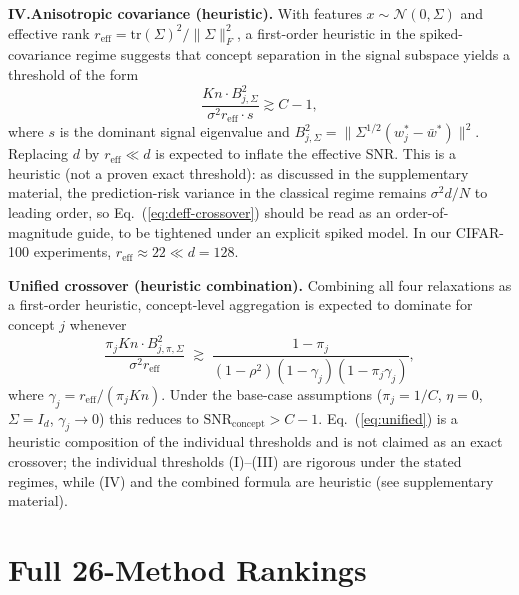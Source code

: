 \documentclass[11pt]{article}
\newcommand{\SNR}{\mathrm{SNR}_{\mathrm{concept}}}
\begin{document}
\textbf{IV.\;Anisotropic covariance (heuristic).}
With features $x \sim \mathcal{N}(0, \Sigma)$ and effective rank $r_{\mathrm{eff}} = \mathrm{tr}(\Sigma)^2 / \|\Sigma\|_F^2$, a first-order heuristic in the spiked-covariance regime suggests that concept separation in the signal subspace yields a threshold of the form
\begin{equation}\label{eq:deff-crossover}
\frac{Kn \cdot B_{j,\Sigma}^2}{\sigma^2 r_{\mathrm{eff}} \cdot s} \gtrsim C - 1,
\end{equation}
where $s$ is the dominant signal eigenvalue and $B_{j,\Sigma}^2 = \|\Sigma^{1/2}(w_j^* - \bar w^*)\|^2$.
Replacing $d$ by $r_{\mathrm{eff}} \ll d$ is expected to inflate the effective SNR. This is a heuristic (not a proven exact threshold): as discussed in the supplementary material, the prediction-risk variance in the classical regime remains $\sigma^2 d / N$ to leading order, so Eq.~(\ref{eq:deff-crossover}) should be read as an order-of-magnitude guide, to be tightened under an explicit spiked model.
In our CIFAR-100 experiments, $r_{\mathrm{eff}} \approx 22 \ll d = 128$.

\textbf{Unified crossover (heuristic combination).}
Combining all four relaxations as a first-order heuristic, concept-level aggregation is expected to dominate for concept $j$ whenever
\begin{equation}\label{eq:unified}
\frac{\pi_j K n \cdot B_{j,\pi,\Sigma}^2}{\sigma^2 r_{\mathrm{eff}}}
\;\gtrsim\; \frac{1 - \pi_j}{(1 - \rho^2)(1 - \gamma_j)(1 - \pi_j\gamma_j)},
\end{equation}
where $\gamma_j = r_{\mathrm{eff}} / (\pi_j K n)$.
Under the base-case assumptions ($\pi_j{=}1/C$, $\eta{=}0$, $\Sigma{=}I_d$, $\gamma_j{\to}0$) this reduces to $\SNR > C{-}1$. Eq.~(\ref{eq:unified}) is a heuristic composition of the individual thresholds and is not claimed as an exact crossover; the individual thresholds (I)--(III) are rigorous under the stated regimes, while (IV) and the combined formula are heuristic (see supplementary material).


\section{Full 26-Method Rankings}
\label{app:full_rankings}
\end{document}
